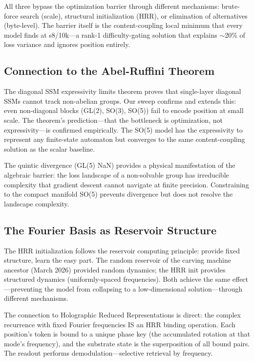 \documentclass[11pt,a4paper]{article}
\begin{document}
All three bypass the optimization barrier through different mechanisms: brute-force search (scale), structural initialization (HRR), or elimination of alternatives (byte-level). The barrier itself is the content-coupling local minimum that every model finds at s8/10k---a rank-1 difficulty-gating solution that explains $\sim$20\% of loss variance and ignores position entirely.

\subsection{Connection to the Abel-Ruffini Theorem}

The diagonal SSM expressivity limits theorem \cite{diagonal_ssm_limits} proves that single-layer diagonal SSMs cannot track non-abelian groups. Our sweep confirms and extends this: even non-diagonal blocks (GL(2), SO(3), SO(5)) fail to encode position at small scale. The theorem's prediction---that the bottleneck is optimization, not expressivity---is confirmed empirically. The SO(5) model has the expressivity to represent any finite-state automaton but converges to the same content-coupling solution as the scalar baseline.

The quintic divergence (GL(5) NaN) provides a physical manifestation of the algebraic barrier: the loss landscape of a non-solvable group has irreducible complexity that gradient descent cannot navigate at finite precision. Constraining to the compact manifold SO(5) prevents divergence but does not resolve the landscape complexity.

\subsection{The Fourier Basis as Reservoir Structure}

The HRR initialization follows the reservoir computing principle: provide fixed structure, learn the easy part. The random reservoir of the carving machine ancestor (March 2026) provided random dynamics; the HRR init provides structured dynamics (uniformly-spaced frequencies). Both achieve the same effect---preventing the model from collapsing to a low-dimensional solution---through different mechanisms.

The connection to Holographic Reduced Representations \cite{plate1991} is direct: the complex recurrence with fixed Fourier frequencies IS an HRR binding operation. Each position's token is bound to a unique phase key (the accumulated rotation at that mode's frequency), and the substrate state is the superposition of all bound pairs. The readout performs demodulation---selective retrieval by frequency.
\end{document}
